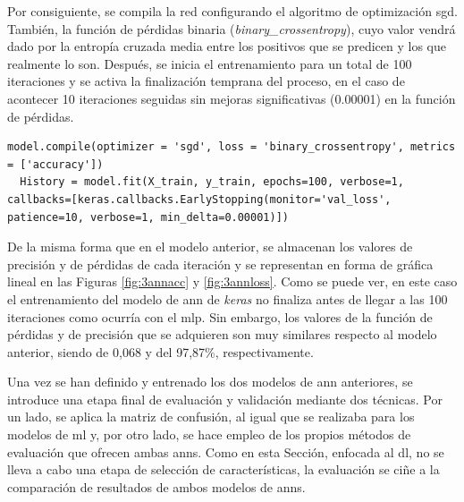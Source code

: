 \vspace{3mm}

Por consiguiente, se compila la red configurando el algoritmo de optimización \gls{sgd}. También, la función de pérdidas binaria (\textit{binary\_crossentropy}), cuyo valor vendrá dado por la entropía cruzada media entre los positivos que se predicen y los que realmente lo son. Después, se inicia el entrenamiento para un total de 100 iteraciones y se activa la finalización temprana del proceso, en el caso de acontecer 10 iteraciones seguidas sin mejoras significativas (0.00001) en la función de pérdidas. \cite{early}

\vspace{3mm}

\begin{lstlisting}[style=Python, caption={Entrenamiento del modelo de ANN de Keras}]
  model.compile(optimizer = 'sgd', loss = 'binary_crossentropy', metrics = ['accuracy'])
  History = model.fit(X_train, y_train, epochs=100, verbose=1, callbacks=[keras.callbacks.EarlyStopping(monitor='val_loss', patience=10, verbose=1, min_delta=0.00001)])
\end{lstlisting}

\vspace{3mm}

De la misma forma que en el modelo anterior, se almacenan los valores de precisión y de pérdidas de cada iteración y se representan en forma de gráfica lineal en las Figuras \ref{fig:3annacc} y \ref{fig:3annloss}. Como se puede ver, en este caso el entrenamiento del modelo de \gls{ann} de \textit{keras} no finaliza antes de llegar a las 100 iteraciones como ocurría con el \gls{mlp}. Sin embargo, los valores de la función de pérdidas y de precisión que se adquieren son muy similares respecto al modelo anterior, siendo de 0,068 y del 97,87\%, respectivamente. 

\vspace{3mm}

Una vez se han definido y entrenado los dos modelos de \gls{ann} anteriores, se introduce una etapa final de evaluación y validación mediante dos técnicas. Por un lado, se aplica la matriz de confusión, al igual que se realizaba para los modelos de \gls{ml} y, por otro lado, se hace empleo de los propios métodos de evaluación que ofrecen ambas \gls{ann}s. Como en esta Sección, enfocada al \gls{dl}, no se lleva a cabo una etapa de selección de características, la evaluación se ciñe a la comparación de resultados de ambos modelos de \gls{ann}s. 

